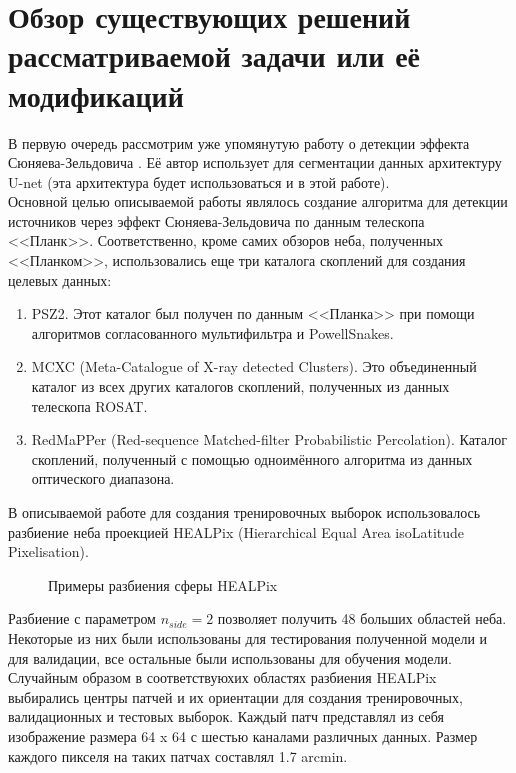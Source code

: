 \chapter{Обзор существующих решений рассматриваемой задачи или её модификаций}
\label{cha:ch_2}
В первую очередь рассмотрим уже упомянутую работу о детекции эффекта 
Сюняева-Зельдовича \cite{Bonjean}. Её автор использует для сегментации данных архитектуру U-net 
(эта архитектура будет использоваться и в этой работе). \\

Основной целью описываемой работы являлось создание алгоритма для детекции источников через эффект 
Сюняева-Зельдовича по данным телескопа <<Планк>>. Соответственно, кроме самих обзоров неба, полученных 
<<Планком>>, использовались еще три каталога скоплений для создания целевых данных:

\begin{enumerate}
	\item PSZ2. Этот каталог был получен по данным <<Планка>>  при помощи алгоритмов 
	согласованного мультифильтра и PowellSnakes.
	\item MCXC (Meta-Catalogue of X-ray detected Clusters). Это объединенный каталог из всех 
	других каталогов скоплений, полученных из данных телескопа ROSAT.
	\item RedMaPPer (Red-sequence Matched-filter Probabilistic Percolation). Каталог скоплений, 
	полученный с помощью одноимённого алгоритма из данных оптического диапазона.
\end{enumerate}

В описываемой работе для создания тренировочных выборок использовалось разбиение неба проекцией 
HEALPix (Hierarchical Equal Area isoLatitude Pixelisation). \\
\begin{figure}[h]
	\caption{Примеры разбиения сферы HEALPix \cite{Healpix}}
\end{figure}

Разбиение с параметром $n_{side}=2$ позволяет получить 48 больших областей неба. Некоторые из них 
были использованы для тестирования полученной модели и для валидации, все остальные были 
использованы для обучения модели.\\ 

Случайным образом в соответствуюхих областях разбиения HEALPix выбирались центры патчей и их 
ориентации для создания тренировочных, валидационных и тестовых выборок. Каждый патч представлял 
из себя изображение размера 64 x 64 с шестью каналами различных данных. Размер каждого пикселя 
на таких патчах составлял 1.7 arcmin. \\

